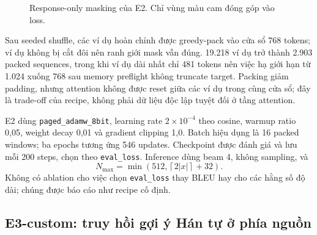\begin{figure}[tbp]
  \centering
  \caption{Response-only masking của E2. Chỉ vùng màu cam đóng góp vào loss.}
  \label{fig:response-mask}
\end{figure}

Sau seeded shuffle, các ví dụ hoàn chỉnh được greedy-pack vào cửa sổ 768
tokens; ví dụ không bị cắt đôi nên ranh giới mask vẫn đúng. 19.218 ví dụ trở
thành 2.903 packed sequences, trong khi ví dụ dài nhất chỉ 481 tokens nên việc
hạ giới hạn từ 1.024 xuống 768 sau memory preflight không truncate target.
Packing giảm padding, nhưng attention không được reset giữa các ví dụ trong
cùng cửa sổ; đây là trade-off của recipe, không phải dữ liệu độc lập tuyệt đối
ở tầng attention.

E2 dùng \texttt{paged\_adamw\_8bit}, learning rate $2\times10^{-4}$ theo
cosine, warmup ratio 0,05, weight decay 0,01 và gradient clipping 1,0. Batch
hiệu dụng là 16 packed windows; ba epochs tương ứng 546 updates. Checkpoint
được đánh giá và lưu mỗi 200 steps, chọn theo \texttt{eval\_loss}. Inference
dùng beam 4, không sampling, và
\begin{equation}
  N_{\max}=\min\left(512,\left\lceil2|x|\right\rceil+32\right).
\end{equation}
Không có ablation cho việc chọn \texttt{eval\_loss} thay BLEU hay cho các
hằng số độ dài; chúng được báo cáo như recipe cố định.

\subsection{E3-custom: truy hồi gợi ý Hán tự ở phía nguồn}


